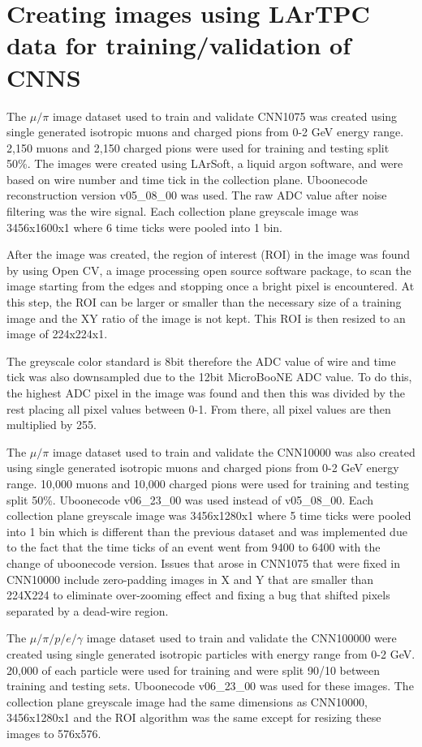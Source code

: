 \section{Creating images using LArTPC data for training/validation of CNNS}\label{image_making}
The $\mu/\pi$ image dataset used to train and validate CNN1075 was created using single generated isotropic muons and charged pions from 0-2 GeV energy range. 2,150 muons and 2,150 charged pions were used for training and testing split 50\%. The images were created using LArSoft, a liquid argon software, and were based on wire number and time tick in the collection plane. Uboonecode reconstruction version v05{\_}08{\_}00 was used. The raw ADC value after noise filtering was the wire signal. Each collection plane greyscale image was 3456x1600x1 where 6 time ticks were pooled into 1 bin. 

After the image was created, the region of interest (ROI) in the image was found by using Open CV, a image processing open source software package, to scan the image starting from the edges and stopping once a bright pixel is encountered. At this step, the ROI can be larger or smaller than the necessary size of a training image and the XY ratio of the image is not kept. This ROI is then resized to an image of 224x224x1. 

The greyscale color standard is 8bit therefore the ADC value of wire and time tick was also downsampled due to the 12bit MicroBooNE ADC value. To do this, the highest ADC pixel in the image was found and then this was divided by the rest placing all pixel values between 0-1. From there, all pixel values are then multiplied by 255.

The $\mu/\pi$ image dataset used to train and validate the CNN10000 was also created using single generated isotropic muons and charged pions from 0-2 GeV energy range. 10,000 muons and 10,000 charged pions were used for training and testing split 50\%. Uboonecode v06{\_}23{\_}00 was used instead of v05{\_}08{\_}00. Each collection plane greyscale image was 3456x1280x1 where 5 time ticks were pooled into 1 bin which is different than the previous dataset and was implemented due to the fact that the time ticks of an event went from 9400 to 6400 with the change of uboonecode version. Issues that arose in CNN1075 that were fixed in CNN10000 include zero-padding images in X and Y that are smaller than 224X224 to eliminate over-zooming effect and fixing a bug that shifted pixels separated by a dead-wire region.

The $\mu/\pi/p/e/\gamma$ image dataset used to train and validate the CNN100000 were created using single generated isotropic particles with energy range from 0-2 GeV. 20,000 of each particle were used for training and were split 90/10 between training and testing sets. Uboonecode v06{\_}23{\_}00 was used for these images. The collection plane greyscale image had the same dimensions as CNN10000, 3456x1280x1 and the ROI algorithm was the same except for resizing these images to 576x576. 

